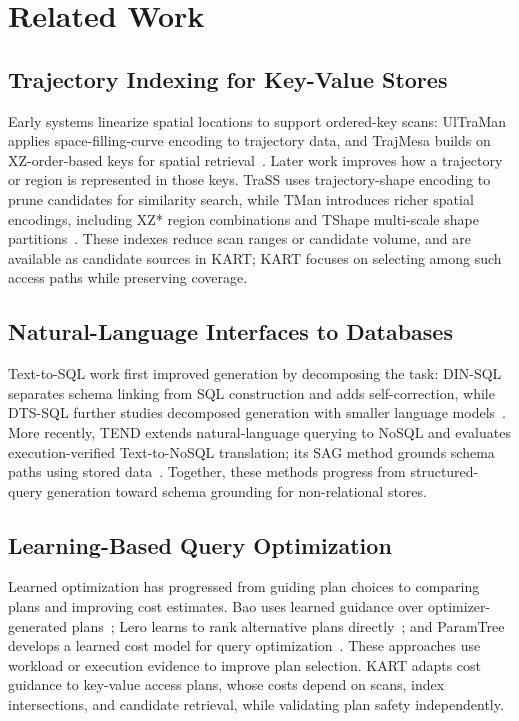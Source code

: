 \section{Related Work}\label{sec:related-work}

\subsection{Trajectory Indexing for Key-Value Stores}
Early systems linearize spatial locations to support ordered-key scans: UlTraMan applies space-filling-curve encoding to trajectory data, and TrajMesa builds on XZ-order-based keys for spatial retrieval~\cite{ultraman,trajmesa}.
  Later work improves how a trajectory or region is represented in those keys. TraSS uses trajectory-shape encoding to prune candidates for similarity search, while TMan introduces richer spatial encodings, including XZ* region combinations and TShape multi-scale shape partitions~\cite{trass,tman}.
  These indexes reduce scan ranges or candidate volume, and are available as candidate sources in KART; KART focuses on selecting among such access paths while preserving coverage.

\subsection{Natural-Language Interfaces to Databases}
Text-to-SQL work first improved generation by decomposing the task: DIN-SQL separates schema linking from SQL construction and adds self-correction, while DTS-SQL further studies decomposed generation with smaller language models~\cite{din,dts}.
  More recently, TEND extends natural-language querying to NoSQL and evaluates execution-verified Text-to-NoSQL translation; its SAG method grounds schema paths using stored data~\cite{tend}.
  Together, these methods progress from structured-query generation toward schema grounding for non-relational stores. 

\subsection{Learning-Based Query Optimization}
Learned optimization has progressed from guiding plan choices to comparing plans and improving cost estimates. Bao uses learned guidance over optimizer-generated plans~\cite{bao}; Lero learns to rank alternative plans directly~\cite{lero}; and ParamTree develops a learned cost model for query optimization~\cite{paramtree}.
  These approaches use workload or execution evidence to improve plan selection. KART adapts cost guidance to key-value access plans, whose costs depend on scans, index intersections, and candidate retrieval, while validating plan safety independently.
